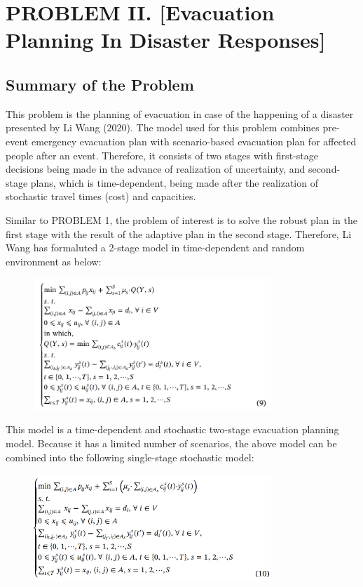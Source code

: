\newpage
\section{PROBLEM II. [Evacuation Planning In Disaster Responses]}
	\subsection{Summary of the Problem}

	\qquad This problem is the planning of evacuation in case of the happening of a disaster presented by Li Wang (2020). The model used for this problem combines pre-event emergency evacuation plan with scenario-based evacuation plan for affected people after an event. Therefore, it consists of two stages with first-stage decisions being made in the advance of realization of uncertainty, and second-stage plans, which is time-dependent, being made after the realization of stochastic travel times (cost) and capacities.

	\qquad Similar to PROBLEM 1, the problem of interest is to solve the robust plan in the first stage with the result of the adaptive plan in the second stage. Therefore, Li Wang has formaluted a 2-stage model in time-dependent and random environment as below:

	\begin{figure}[htbp]
		\centering
		\includegraphics[width=0.8\textwidth]{graphics/liwang_model_1.png}
	\end{figure}

	\qquad This model is a time-dependent and stochastic two-stage evacuation planning model. Because it has a limited number of scenarios, the above model can be combined into the following single-stage stochastic model:

	\begin{figure}[htbp]
		\centering
		\includegraphics[width=0.8\textwidth]{graphics/liwang_model_2.png}
	\end{figure}

